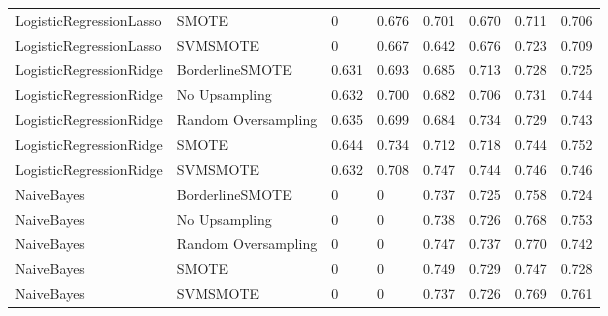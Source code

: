 \begin{tabular}{llllllll}
     LogisticRegressionLasso &               SMOTE &     0 &                     0.676 &                 0.701 &                  0.670 &                                   0.711 &    0.706 \\
     LogisticRegressionLasso &            SVMSMOTE &     0 &                     0.667 &                 0.642 &                  0.676 &                                   0.723 &    0.709 \\
     LogisticRegressionRidge &     BorderlineSMOTE & 0.631 &                     0.693 &                 0.685 &                  0.713 &                                   0.728 &    0.725 \\
     LogisticRegressionRidge &       No Upsampling & 0.632 &                     0.700 &                 0.682 &                  0.706 &                                   0.731 &    0.744 \\
     LogisticRegressionRidge & Random Oversampling & 0.635 &                     0.699 &                 0.684 &                  0.734 &                                   0.729 &    0.743 \\
     LogisticRegressionRidge &               SMOTE & 0.644 &                     0.734 &                 0.712 &                  0.718 &                                   0.744 &    0.752 \\
     LogisticRegressionRidge &            SVMSMOTE & 0.632 &                     0.708 &                 0.747 &                  0.744 &                                   0.746 &    0.746 \\
                  NaiveBayes &     BorderlineSMOTE &     0 &                         0 &                 0.737 &                  0.725 &                                   0.758 &    0.724 \\
                  NaiveBayes &       No Upsampling &     0 &                         0 &                 0.738 &                  0.726 &                                   0.768 &    0.753 \\
                  NaiveBayes & Random Oversampling &     0 &                         0 &                 0.747 &                  0.737 &                                   0.770 &    0.742 \\
                  NaiveBayes &               SMOTE &     0 &                         0 &                 0.749 &                  0.729 &                                   0.747 &    0.728 \\
                  NaiveBayes &            SVMSMOTE &     0 &                         0 &                 0.737 &                  0.726 &                                   0.769 &    0.761 \\

\end{tabular}
